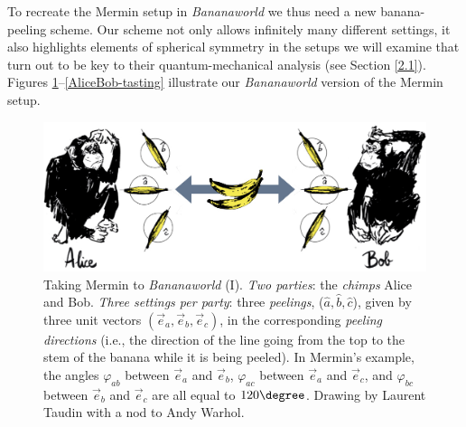 To recreate the Mermin setup in \emph{Bananaworld} we thus need a new banana-peeling scheme. Our scheme not only allows infinitely many different settings, it also highlights elements of spherical symmetry in the setups we will examine that turn out to be key to their quantum-mechanical analysis (see Section \ref{2.1}). Figures \ref{AliceBob-Mermin}--\ref{AliceBob-tasting} illustrate our \emph{Bananaworld} version of the Mermin setup.  

\begin{figure}[h]
\centering
    \includegraphics[width=6in]{AliceBob-Mermin.jpg}
 \caption{Taking Mermin to \emph{Bananaworld} (I). \emph{Two parties}: the \emph{chimps} Alice and Bob. \emph{Three settings per party}: three \emph{peelings}, ($\hat{a}, \hat{b}, \hat{c}$), given by three unit vectors $(\vec{e}_a, \vec{e}_b, \vec{e}_c)$, in the corresponding \emph{peeling directions} (i.e., the direction of the line going from the top to the stem of the banana while it is being peeled). In Mermin's example, the angles $\varphi_{ab}$ between $\vec{e}_a$ and $\vec{e}_b$, $\varphi_{ac}$ between $\vec{e}_a$ and $\vec{e}_c$, and $\varphi_{bc}$ between $\vec{e}_b$ and $\vec{e}_c$ are all equal to $120\degree$. Drawing by Laurent  Taudin with a nod to Andy Warhol.}
   \label{AliceBob-Mermin}
\end{figure}

